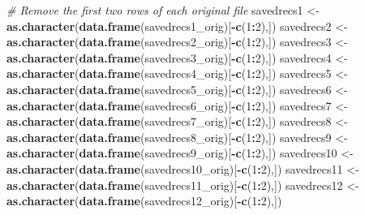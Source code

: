 \documentclass[
]{article}
\newenvironment{Shaded}{\begin{snugshade}}{\end{snugshade}}
\newcommand{\CommentTok}[1]{\textcolor[rgb]{0.56,0.35,0.01}{\textit{#1}}}
\newcommand{\DecValTok}[1]{\textcolor[rgb]{0.00,0.00,0.81}{#1}}
\newcommand{\KeywordTok}[1]{\textcolor[rgb]{0.13,0.29,0.53}{\textbf{#1}}}
\newcommand{\NormalTok}[1]{#1}
\newcommand{\OperatorTok}[1]{\textcolor[rgb]{0.81,0.36,0.00}{\textbf{#1}}}
\newcommand{\StringTok}[1]{\textcolor[rgb]{0.31,0.60,0.02}{#1}}
\begin{document}
\begin{Shaded}
\begin{Highlighting}[]
\CommentTok{# Remove the first two rows of each original file}
\NormalTok{savedrecs1 <-}\StringTok{ }\KeywordTok{as.character}\NormalTok{(}\KeywordTok{data.frame}\NormalTok{(savedrecs1_orig)[}\OperatorTok{-}\KeywordTok{c}\NormalTok{(}\DecValTok{1}\OperatorTok{:}\DecValTok{2}\NormalTok{),])}
\NormalTok{savedrecs2 <-}\StringTok{ }\KeywordTok{as.character}\NormalTok{(}\KeywordTok{data.frame}\NormalTok{(savedrecs2_orig)[}\OperatorTok{-}\KeywordTok{c}\NormalTok{(}\DecValTok{1}\OperatorTok{:}\DecValTok{2}\NormalTok{),])}
\NormalTok{savedrecs3 <-}\StringTok{ }\KeywordTok{as.character}\NormalTok{(}\KeywordTok{data.frame}\NormalTok{(savedrecs3_orig)[}\OperatorTok{-}\KeywordTok{c}\NormalTok{(}\DecValTok{1}\OperatorTok{:}\DecValTok{2}\NormalTok{),])}
\NormalTok{savedrecs4 <-}\StringTok{ }\KeywordTok{as.character}\NormalTok{(}\KeywordTok{data.frame}\NormalTok{(savedrecs4_orig)[}\OperatorTok{-}\KeywordTok{c}\NormalTok{(}\DecValTok{1}\OperatorTok{:}\DecValTok{2}\NormalTok{),])}
\NormalTok{savedrecs5 <-}\StringTok{ }\KeywordTok{as.character}\NormalTok{(}\KeywordTok{data.frame}\NormalTok{(savedrecs5_orig)[}\OperatorTok{-}\KeywordTok{c}\NormalTok{(}\DecValTok{1}\OperatorTok{:}\DecValTok{2}\NormalTok{),])}
\NormalTok{savedrecs6 <-}\StringTok{ }\KeywordTok{as.character}\NormalTok{(}\KeywordTok{data.frame}\NormalTok{(savedrecs6_orig)[}\OperatorTok{-}\KeywordTok{c}\NormalTok{(}\DecValTok{1}\OperatorTok{:}\DecValTok{2}\NormalTok{),])}
\NormalTok{savedrecs7 <-}\StringTok{ }\KeywordTok{as.character}\NormalTok{(}\KeywordTok{data.frame}\NormalTok{(savedrecs7_orig)[}\OperatorTok{-}\KeywordTok{c}\NormalTok{(}\DecValTok{1}\OperatorTok{:}\DecValTok{2}\NormalTok{),])}
\NormalTok{savedrecs8 <-}\StringTok{ }\KeywordTok{as.character}\NormalTok{(}\KeywordTok{data.frame}\NormalTok{(savedrecs8_orig)[}\OperatorTok{-}\KeywordTok{c}\NormalTok{(}\DecValTok{1}\OperatorTok{:}\DecValTok{2}\NormalTok{),])}
\NormalTok{savedrecs9 <-}\StringTok{ }\KeywordTok{as.character}\NormalTok{(}\KeywordTok{data.frame}\NormalTok{(savedrecs9_orig)[}\OperatorTok{-}\KeywordTok{c}\NormalTok{(}\DecValTok{1}\OperatorTok{:}\DecValTok{2}\NormalTok{),])}
\NormalTok{savedrecs10 <-}\StringTok{ }\KeywordTok{as.character}\NormalTok{(}\KeywordTok{data.frame}\NormalTok{(savedrecs10_orig)[}\OperatorTok{-}\KeywordTok{c}\NormalTok{(}\DecValTok{1}\OperatorTok{:}\DecValTok{2}\NormalTok{),])}
\NormalTok{savedrecs11 <-}\StringTok{ }\KeywordTok{as.character}\NormalTok{(}\KeywordTok{data.frame}\NormalTok{(savedrecs11_orig)[}\OperatorTok{-}\KeywordTok{c}\NormalTok{(}\DecValTok{1}\OperatorTok{:}\DecValTok{2}\NormalTok{),])}
\NormalTok{savedrecs12 <-}\StringTok{ }\KeywordTok{as.character}\NormalTok{(}\KeywordTok{data.frame}\NormalTok{(savedrecs12_orig)[}\OperatorTok{-}\KeywordTok{c}\NormalTok{(}\DecValTok{1}\OperatorTok{:}\DecValTok{2}\NormalTok{),])}

\end{Highlighting}
\end{Shaded}
\end{document}
